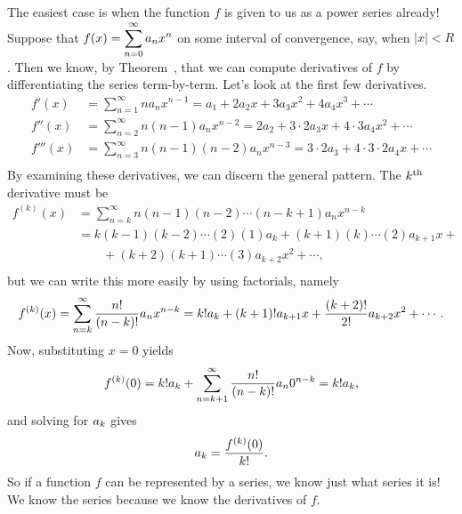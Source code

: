 The easiest case is when the function $f$ is given to us as a power
series already!
Suppose that $\displaystyle f(x)=\sum_{n=0}^\infty a_nx^n$ on some interval of
convergence, say, when $|x| < R$.  Then we know, by
Theorem~, that we can compute
derivatives of $f$ by differentiating the series term-by-term.  Let's
look at the first few derivatives.
\begin{align*}
  f'(x)&=\sum_{n=1}^\infty n a_n x^{n-1}=a_1 + 2a_2x+3a_3x^2+4a_4x^3+\cdots \\
  f''(x)&=\sum_{n=2}^\infty n(n-1) a_n x^{n-2}=2a_2+3\cdot2a_3x
    +4\cdot3a_4x^2+\cdots \\
  f'''(x)&=\sum_{n=3}^\infty n(n-1)(n-2) a_n x^{n-3}=3\cdot2a_3
    +4\cdot3\cdot2a_4x+\cdots \\
\end{align*}
By examining these derivatives, we can discern the
general pattern. The $k^{\mbox{\scriptsize th}}$ derivative must be
\begin{align*}
  f^{(k)}(x)&=\sum_{n=k}^\infty n(n-1)(n-2)\cdots(n-k+1)a_nx^{n-k} \\
  &=k(k-1)(k-2)\cdots(2)(1)a_k+(k+1)(k)\cdots(2)a_{k+1}x+{} \\
  &\qquad {}+(k+2)(k+1)\cdots(3)a_{k+2}x^2+\cdots, \\
\end{align*}
but we can write this more easily by using factorials, namely
$$
  f^{(k)}(x)=\sum_{n=k}^\infty {n!\over (n-k)!}a_nx^{n-k}=
  k!a_k+(k+1)!a_{k+1}x+{(k+2)!\over 2!}a_{k+2}x^2+\cdots.
$$
Now, substituting $x=0$ yields
$$f^{(k)}(0)=k!a_k+\sum_{n=k+1}^\infty {n!\over (n-k)!}a_n0^{n-k}=k!a_k,$$
and solving for $\displaystyle a_k$ gives
$$a_k={f^{(k)}(0)\over k!}.$$
So if a function $f$ can be represented by a series, we know just what
series it is!  We know the series because we know the derivatives of
$f$.

